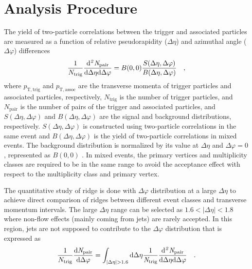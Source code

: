 \section{Analysis Procedure}
\label{sec:ana}

The yield of two-particle correlations between the trigger and associated particles are measured as a function of relative pseudorapidity ($\Delta\eta$) and azimuthal angle ($\Delta\varphi$) differences
\begin{eqnarray}
\frac{1}{N_{\rm{trig}}} \frac{ \rm{d}\it{}^{2} N_{\rm{pair}} }{ \rm{d} \Delta\eta \rm{d}\Delta\varphi} = B(0, 0)\frac{S(\Delta\eta, \Delta\varphi)}{B(\Delta\eta, \Delta\varphi)}\quad,
\end{eqnarray}
where  $p_{\mathrm{T, trig}}$ and $p_{\mathrm{T, assoc}}$ are the transverse momenta of  trigger particles and associated particles, respectively, $N_\mathrm{trig}$ is the number of trigger particles, and $N_\mathrm{pair}$ is the number of pairs of the trigger and associated particles, and $S (\Delta\eta, \Delta\varphi)$ and $B (\Delta\eta, \Delta\varphi)$ are the signal and background distributions, respectively. $S (\Delta\eta, \Delta\varphi)$ is constructed using two-particle correlations in the same event and $B(\Delta\eta, \Delta\varphi)$ is the yield of two-particle correlations in mixed events. The background distribution is normalized by its value at $\Delta\eta$ and $\Delta\varphi = 0$, represented as $B (0,0)$ . In mixed events, the primary vertices and multiplicity classes are required to be in the same range to avoid the acceptance effect with respect to the multiplicity class and primary vertex.

 The quantitative study of ridge is done with $\Delta\varphi$ distribution at a large $\Delta\eta$ to achieve direct comparison of ridges between different event classes and transverse momentum intervals. The large $\Delta\eta$ range can be selected as $1.6<|\Delta\eta|<1.8$ where non-flow effects (mainly coming from jets) are rarely accepted. In this region, jets are not supposed to contribute to the $\Delta\varphi$ distribution that is expressed as
\begin{eqnarray}
\frac{1}{N_{\rm{trig}}} \frac{ \rm{d}\it{}N_{\rm{pair}} }{ \rm{d}\Delta\varphi } = \int_{|\Delta \eta|>1.6} \rm{d} \Delta \eta \frac{1}{\it{N}_{\rm{trig}}} \frac{ \rm{d}\it{}^{2} N_{\rm{pair}} }{ \rm{d}\Delta\eta d\Delta\varphi} \quad.
\end{eqnarray}

